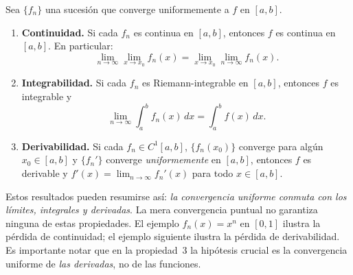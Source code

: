 \begin{theorem}
\label{thm:prop_uniforme}
Sea $\{f_n\}$ una sucesión que converge uniformemente a $f$ en $[a,b]$.
\begin{enumerate}
    \item \textbf{Continuidad.} Si cada $f_n$ es continua en $[a,b]$,
          entonces $f$ es continua en $[a,b]$. En particular:
          \[
              \lim_{n\to\infty}\lim_{x\to x_0} f_n(x)
              = \lim_{x\to x_0}\lim_{n\to\infty} f_n(x).
          \]
    \item \textbf{Integrabilidad.} Si cada $f_n$ es
          Riemann-integrable en $[a,b]$, entonces $f$ es integrable y
          \[
              \lim_{n \to \infty} \int_a^b f_n(x)\,dx
              = \int_a^b f(x)\,dx.
          \]
    \item \textbf{Derivabilidad.} Si cada $f_n \in C^1[a,b]$,
          $\{f_n(x_0)\}$ converge para algún $x_0 \in [a,b]$ y
          $\{f_n'\}$ converge \emph{uniformemente} en $[a,b]$,
          entonces $f$ es derivable y
          $f'(x) = \lim_{n \to \infty} f_n'(x)$ para todo
          $x \in [a,b]$.
\end{enumerate}
\end{theorem}

\begin{rem}
Estos resultados pueden resumirse así: \emph{la convergencia uniforme
conmuta con los límites, integrales y derivadas}. La mera convergencia
puntual no garantiza ninguna de estas propiedades. El ejemplo
$f_n(x) = x^n$ en $[0,1]$ ilustra la pérdida de continuidad; el
ejemplo siguiente ilustra la pérdida de derivabilidad. Es importante
notar que en la propiedad~3 la hipótesis crucial es la convergencia
uniforme de \emph{las derivadas}, no de las funciones.
\end{rem}

